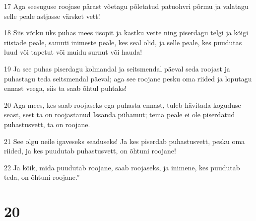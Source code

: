 \par 17 Aga seesuguse roojase pärast võetagu põletatud patuohvri põrmu ja valatagu selle peale astjasse värsket vett!
\par 18 Siis võtku üks puhas mees iisopit ja kastku vette ning piserdagu telgi ja kõigi riistade peale, samuti inimeste peale, kes seal olid, ja selle peale, kes puudutas luud või tapetut või muidu surnut või hauda!
\par 19 Ja see puhas piserdagu kolmandal ja seitsmendal päeval seda roojast ja puhastagu teda seitsmendal päeval; aga see roojane pesku oma riided ja loputagu ennast veega, siis ta saab õhtul puhtaks!
\par 20 Aga mees, kes saab roojaseks ega puhasta ennast, tuleb hävitada koguduse seast, sest ta on roojastanud Issanda pühamut; tema peale ei ole piserdatud puhastusvett, ta on roojane.
\par 21 See olgu neile igaveseks seaduseks! Ja kes piserdab puhastusvett, pesku oma riided, ja kes puudutab puhastusvett, on õhtuni roojane!
\par 22 Ja kõik, mida puudutab roojane, saab roojaseks, ja inimene, kes puudutab teda, on õhtuni roojane.”

\chapter{20}

